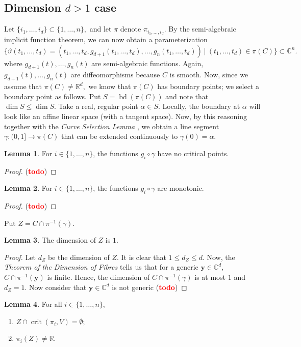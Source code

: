 \documentclass[10pt]{article}
\theoremstyle{definition}
\newtheorem{lemma}{Lemma}
\newcommand{\C}{\mathbb{C}}
\newcommand{\R}{\mathbb{R}}
\def\td{(\textcolor{red}{{\bf todo}})}
\def\td{(\textcolor{red}{{\bf todo}}) }
\DeclareMathOperator{\bd}{bd}
\DeclareMathOperator{\crit}{crit}
\begin{document}
\subsection{Dimension $d>1$ case}
Let $\{i_1,\hdots,i_d\} \subset \{1,\hdots,n\},$ and let $\pi$ denote $\pi_{i_1,\hdots,i_d}.$ By the semi-algebraic implicit function theorem, we can now obtain a parameterization
\[
\big\{\vartheta(t_1,\hdots,t_d) = \left(t_1,\hdots,t_d,g_{d+1}(t_1,\hdots,t_d),\hdots,g_{n}(t_1,\hdots,t_d)\right)~|~ (t_1,\hdots,t_d) \in \pi(C)\big\} \subset \C^n.
\]
where $g_{d+1}(t),\hdots,g_n(t)$ are semi-algebraic functions.  Again, $g_{d+1}(t),\hdots,g_n(t)$ are diffeomorphisms because $C$ is smooth. Now, since we assume that $\pi(C) \not = \R^d,$ we know that $\pi(C)$ has boundary points; we select a boundary point as follows. Put $S = \bd\left( \pi(C) \right)$ and note that $\dim S \leq \dim \overline{S}.$ Take a real, regular point $\alpha \in \overline{S}.$ Locally, the boundary at $\alpha$ will look like an affine linear space (with a tangent space). Now, by this reasoning together with the \textit{Curve Selection Lemma} \cite{CurveSelectionLemma},  
we obtain a line segment $\gamma: (0,1] \rightarrow \pi(C)$ that can be extended continuously to $\gamma(0)=\alpha.$ 
%
\begin{lemma}
For $i \in \{1,\hdots,n\}$, the functions $g_i \circ \gamma$ have no critical points. 
\end{lemma}
%
%
\begin{proof}
\td 
\end{proof}
%
%
\begin{lemma}
For $i \in \{1,\hdots,n\}$, the functions $g_i \circ \gamma$ are monotonic. 
\end{lemma}
%
%
\begin{proof}
\td 
\end{proof}
%
\noindent 
Put $Z = C \cap \pi^{-1}(\gamma).$ 
%
\begin{lemma}
The dimension of $Z$ is $1$. 
\end{lemma}
%
%
\begin{proof}
Let $d_Z$ be the dimension of $Z$. It is clear that $1 \leq d_Z \leq d$. Now, the 
\textit{Theorem of the Dimension of Fibres}\cite{Shafarevich} tells us that for a generic $\bm y \in \C^d$, $C \cap \pi^{-1}(\bm y)$ is finite. Hence, the dimension of $C \cap \pi^{-1}(\gamma)$ is at most $1$ and $d_Z=1$. Now consider that $\bm y \in \C^d$ is not generic \td  
\end{proof}
%
%
\begin{lemma}\label{lemma:DimensionOneAssumptionsHold}
For all $i \in \{1,\hdots,n\}$, 
\begin{enumerate}
    \item $Z \cap \crit(\pi_i,V) = \emptyset$;
    \item $\pi_i(Z) \not = \R$.
\end{enumerate}
\end{lemma}
\end{document}
